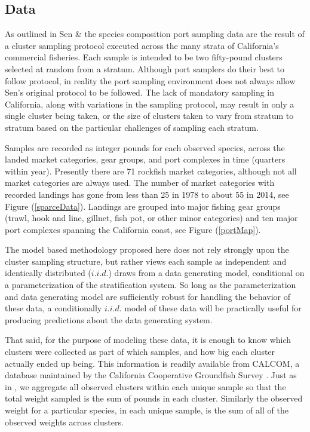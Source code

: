 \documentclass[12pt]{article}
\begin{document}
%
%
\subsection{Data}\label{data}
%
%

%
As outlined in Sen \citeyear{sen_sampling_1984} \& 
\citeyear{sen_methodological_1986} the species composition port sampling data %
are the result of a cluster sampling protocol executed across the many strata 
of California's commercial fisheries.  Each sample is intended to be two 
fifty-pound clusters selected at random from a stratum. Although port samplers 
do their best to follow protocol, in reality the port sampling environment does 
not always allow Sen's original protocol to be followed. The lack of mandatory 
sampling in California, along with variations in the sampling protocol, may 
result in only a single cluster being taken, or the size of clusters taken to 
vary from stratum to stratum based on the particular challenges of sampling 
each stratum.

%
Samples are recorded as integer pounds for each observed species, across the 
landed market categories, gear groups, and port complexes in time (quarters 
within year). Presently there are 71 rockfish market categories, although not 
all market categories are always used. The number of market categories with 
recorded landings has gone from less than 25 in 1978 to about 55 in 2014, see 
Figure (\ref{sparceData}).  Landings are grouped into major fishing gear 
groups (trawl, hook and line, gillnet, fish pot, or other minor categories) 
and ten major port complexes spanning the California coast, see 
Figure (\ref{portMap}).

%
The model based methodology proposed here does not rely strongly upon
the cluster sampling structure, but rather views each sample as
independent and identically distributed (\(i.i.d.\)) draws from a data
generating model, conditional on a parameterization of the
stratification system. So long as the parameterization and data
generating model are sufficiently robust for handling the behavior of
these data, a conditionally \(i.i.d.\) model of these data will be
practically useful for producing predictions about the data generating
system.

%
That said, for the purpose of modeling these data, it is enough to know
which clusters were collected as part of which samples, and how big each
cluster actually ended up being. This information is readily available
from CALCOM, a database maintained by the California Cooperative
Groundfish Survey . Just as in 
, we aggregate all observed clusters within 
each unique sample so that the total weight sampled is the sum of pounds in 
each cluster. Similarly the observed weight for a particular species, in each 
unique sample, is the sum of all of the observed weights across clusters.  
\end{document}
